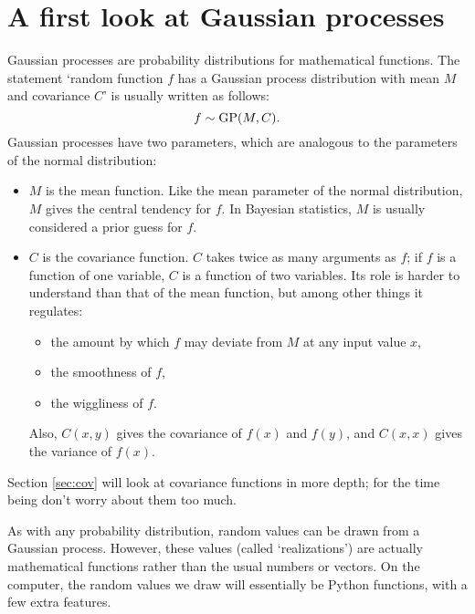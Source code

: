 \documentclass[]{manual}
\begin{document}
\section{A first look at Gaussian processes}\label{sec:firstlook}

Gaussian processes are probability distributions for mathematical functions. The statement `random function $f$ has a Gaussian process distribution with mean $M$ and covariance $C$' is usually written as follows:
\begin{equation}
    f\sim\textup{GP}(M,C).
\end{equation}
Gaussian processes have two parameters, which are analogous to the parameters of the normal distribution:
\begin{itemize}
    \item $M$ is the mean function. Like the mean parameter of the normal distribution, $M$ gives the central tendency for $f$. In Bayesian statistics, $M$ is usually considered a prior guess for $f$.
    \item $C$ is the covariance function. $C$ takes twice as many arguments as $f$; if $f$ is a function of one variable, $C$ is a function of two variables. Its role is harder to understand than that of the mean function, but among other things it regulates:
    \begin{itemize}
        \item the amount by which $f$ may deviate from $M$ at any input value $x$,
        \item the smoothness of $f$,
        \item the wiggliness of $f$.
    \end{itemize}
Also, $C(x,y)$ gives the covariance of $f(x)$ and $f(y)$, and $C(x,x)$ gives the variance of $f(x)$.
\end{itemize}
Section \ref{sec:cov} will look at covariance functions in more depth; for the time being don't worry about them too much.

As with any probability distribution, random values can be drawn from a Gaussian process. However, these values (called `realizations') are actually mathematical functions rather than the usual numbers or vectors. On the computer, the random values we draw will essentially be Python functions, with a few extra features.
\end{document}
